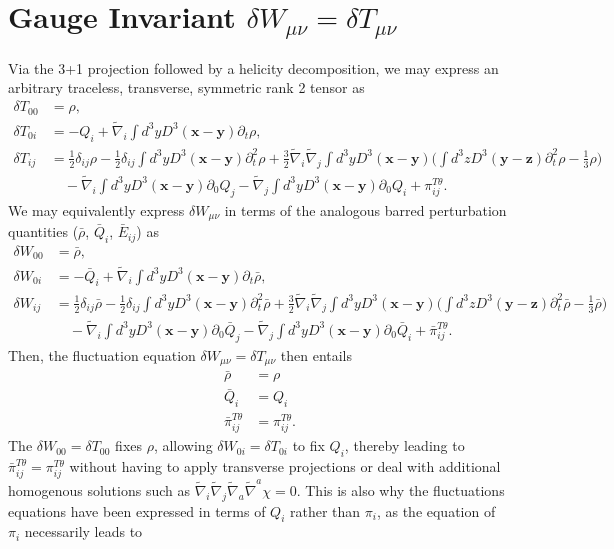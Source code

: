 \documentclass[10pt,letterpaper]{article}
\begin{document}
\section*{Gauge Invariant $\delta W_{\mu\nu} = \delta T_{\mu\nu}$}
Via the 3+1 projection followed by a helicity decomposition, we may express an arbitrary traceless, transverse, symmetric rank 2 tensor as
\begin{align}
\delta T_{00}  &= \rho,
\nonumber\\	
\delta T_{0i} &= -Q_i  + \tilde\nabla_i  \int d^3y D^3(\mathbf x-\mathbf y) \partial_t  \rho,
\nonumber\\	
\delta T_{ij}  &= 
\frac12 \delta_{ij} \rho - \frac12 \delta_{ij} \int d^3y D^3(\mathbf x-\mathbf y) \partial_t^2 \rho +\frac32 \tilde\nabla_i\tilde\nabla_j \int d^3y D^3(\mathbf x-\mathbf y) \bigg( \int d^3z D^3(\mathbf y-\mathbf z) \partial_t^2 \rho - \frac13\rho\bigg) 
\nonumber\\
&\quad -\tilde\nabla_i \int d^3y D^3(\mathbf x - \mathbf y) \partial_0 Q_j - \tilde\nabla_j \int d^3y D^3(\mathbf x - \mathbf y) \partial_0 Q_i + \pi_{ij}^{T\theta}.
\end{align}
We may equivalently express $\delta W_{\mu\nu}$ in terms of the analogous barred perturbation quantities ($\bar \rho$, $\bar Q_i$, $\bar E_{ij}$) as
\begin{align}
\delta W_{00}  &= \bar\rho,
\nonumber\\	
\delta W_{0i} &= -\bar Q_i  + \tilde\nabla_i  \int d^3y D^3(\mathbf x-\mathbf y) \partial_t  \bar\rho,
\nonumber\\	
\delta W_{ij}  &= 
\frac12 \delta_{ij} \bar\rho - \frac12 \delta_{ij} \int d^3y D^3(\mathbf x-\mathbf y) \partial_t^2 \bar\rho +\frac32 \tilde\nabla_i\tilde\nabla_j \int d^3y D^3(\mathbf x-\mathbf y) \bigg( \int d^3z D^3(\mathbf y-\mathbf z) \partial_t^2 \bar\rho - \frac13\bar\rho\bigg) 
\nonumber\\
&\quad -\tilde\nabla_i \int d^3y D^3(\mathbf x - \mathbf y) \partial_0  \bar Q_j - \tilde\nabla_j \int d^3y D^3(\mathbf x - \mathbf y) \partial_0 \bar Q_i + \bar \pi_{ij}^{T\theta}.
\end{align}
Then, the fluctuation equation $\delta W_{\mu\nu} = \delta T_{\mu\nu}$ then entails
\begin{align}
\bar \rho &= \rho
\nonumber\\
\bar Q_i &= Q_i
\nonumber\\
\bar \pi_{ij}^{T\theta} &= \pi_{ij}^{T\theta}.
\end{align}
The $\delta W_{00} = \delta T_{00}$ fixes $\rho$, allowing $\delta W_{0i} = \delta T_{0i}$ to fix $Q_i$, thereby leading to $\bar\pi_{ij}^{T\theta} = \pi_{ij}^{T\theta}$ without having to apply transverse projections or deal with additional homogenous solutions such as $\tilde\nabla_i\tilde\nabla_j \tilde\nabla_a\tilde\nabla^a \chi = 0$. This is also why the fluctuations equations have been expressed in terms of $Q_i$ rather than $\pi_i$, as the equation of $\pi_i$ necessarily leads to 
\end{document}
